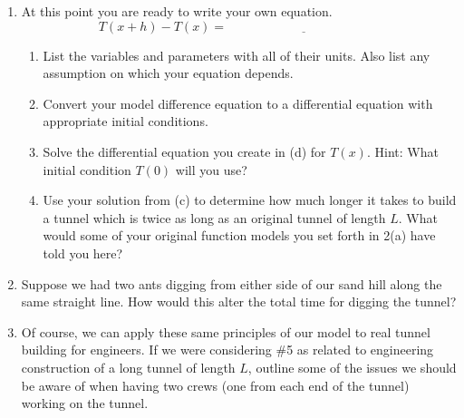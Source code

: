 \begin{lab}
\begin{enumerate}
    \item At this point you are ready to write your own equation. 
        \[ T(x+h) - T(x) = \underline{\hspace{2in}} \]
        \vspace{-1cm}
        \begin{enumerate}
            \item List the variables and parameters with all of their units.  Also list
                any assumption on which your equation depends.
            \item Convert your model difference equation to a differential equation with
                appropriate initial conditions.
            \item Solve the differential equation you create in (d) for $T(x)$. Hint:
                What initial condition $T(0)$ will you use?
            \item Use your solution from (c) to determine how much longer it takes to
                build a tunnel which is twice as long as an original tunnel of length $L$.
                What would some of your original function models you set forth in 2(a) have
                told you here?

        \end{enumerate}

    \item Suppose we had two ants digging from either side of our sand hill along the same
        straight line. How would this alter the total time for digging the tunnel? 

    \item Of course, we can apply these same principles of our model to real tunnel
        building for engineers. If we were considering \#5 as related to engineering
        construction of a long tunnel of length $L$, outline some of the issues we should
        be aware of when having two crews  (one from each end of the tunnel) working on
        the tunnel.
\end{enumerate}


 


\end{lab}



